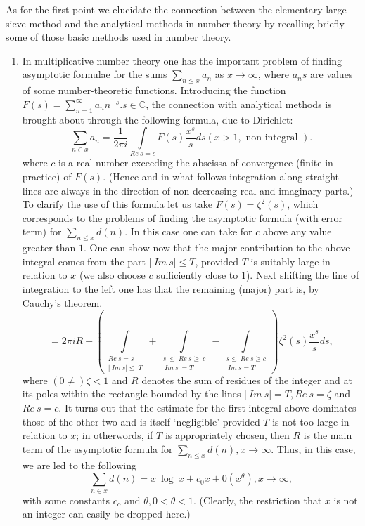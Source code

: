 As for the first point we elucidate the connection between the
elementary large sieve method and the analytical methods in number
theory by recalling briefly some of those basic methods used in number
theory. 
\begin{enumerate}[1)] 
\item In multiplicative number theory one has the important problem of
  finding asymptotic formulae for the sums $\sum\limits_{n \leq x} a_n
  $ as $x \to \infty$, where $a_n s$ are values of some
  number-theoretic functions. Introducing the function $F(s)=
  \sum\limits_{n=1}^{\infty} a_n n^{-s}. s \in \mathbb{C}$, the
  connection with analytical methods is brought about through the
  following formula, due to Dirichlet: 
$$
\sum_{n \in x}a_n = \frac{1}{2 \pi i} \int\limits_{Re~ s = c} F(s)
\frac{x^s}{s} ds  (x> 1 , \text{ non-integral }). 
$$
where $c$ is a real number exceeding the abscissa of convergence
(finite in practice) of $F(s)$. (Hence  and in what follows
integration along straight lines are always in the direction of
non-decreasing real and imaginary parts.) To clarify the use of this
formula let us take $F(s)= \zeta^2 (s)$, which corresponds to the
problems of finding the asymptotic formula (with error term) for
$\sum\limits_{n \leq x}d(n)$. In this case one can take for $c$ above
any value greater than $1$. One can show now that the major
contribution to the above integral comes from the part $|~ Im ~s|\leq
T$, provided $T$ is suitably large in relation to $x$ (we also choose
$c$ sufficiently close to $1$). Next shifting the line of integration
to the left one has that the remaining (major) part is, by Cauchy's
theorem. 
$$
=2 \pi i R + (\int\limits_{\substack{Re~ s =s~ \\ |~ Im ~s | \leq ~T}}
+\int\limits_{\substack{s~ \leq~ Re~ s\geq ~c \\ ~ Im ~s ~ = T}}-
\int\limits_{\substack{s \leq ~Re~ s\geq c \\  ~Im ~s  = T}}) \zeta^2
(s) \frac{x^s}{s}ds, 
$$
where $(0 \neq) \zeta < 1$ and $R$ denotes the sum of residues of the
integer and at its poles within the rectangle bounded by the lines $|~
Im~ s|=T, Re~ s = \zeta$ and $Re~ s=c$. It turns out that the estimate
for the first integral above dominates those of the other two and is
itself `negligible' provided $T$ is not too large in relation to $x$;
in otherwords, if $T$ is appropriately chosen, then $R$ is the main
term of the asymptotic formula for $\sum\limits_{n \leq x} d(n), x \to
\infty$. Thus, in this case, we are led to the following 
$$
\sum_{n \in x} d(n) = x~ \log ~ x + c_0 x+ 0(x^{\theta}), x \to
\infty, 
$$
with some constants $c_o$ and $\theta, 0 < \theta < 1$. (Clearly, the
restriction that $x$ is not an integer can easily be dropped here.) 


\end{enumerate}
